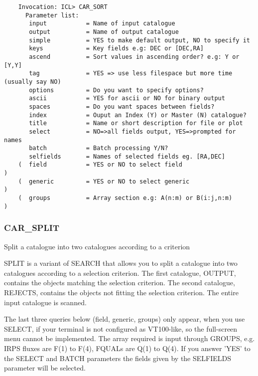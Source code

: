 \begin{verbatim}
    Invocation: ICL> CAR_SORT
      Parameter list:
       input           = Name of input catalogue
       output          = Name of output catalogue
       simple          = YES to make default output, NO to specify it
       keys            = Key fields e.g: DEC or [DEC,RA]
       ascend          = Sort values in ascending order? e.g: Y or [Y,Y]
       tag             = YES => use less filespace but more time (usually say NO)
       options         = Do you want to specify options?
       ascii           = YES for ascii or NO for binary output
       spaces          = Do you want spaces between fields?
       index           = Ouput an Index (Y) or Master (N) catalogue?
       title           = Name or short description for file or plot
       select          = NO=>all fields output, YES=>prompted for names
       batch           = Batch processing Y/N?
       selfields       = Names of selected fields eg. [RA,DEC]
    (  field           = YES or NO to select field                               )
    (  generic         = YES or NO to select generic                             )
    (  groups          = Array section e.g: A(n:m) or B(i:j,n:m)                 )
\end{verbatim}

\subsubsection{CAR\_SPLIT}

Split a catalogue into two catalogues according to a criterion

SPLIT is a variant of SEARCH that allows you to split a catalogue into
two catalogues according to a selection criterion.
The first catalogue, OUTPUT, contains the objects matching the selection
criterion.
The second catalogue, REJECTS, contains the objects not fitting the selection
criterion.
The entire input catalogue is scanned.

The last three queries below (field, generic, groups) only appear, when you use
SELECT, if your terminal is not configured as VT100-like, so the full-screen
menu cannot be implemented.
The array required is input through GROUPS, e.g. IRPS fluxes are F(1) to
F(4), FQUALs are Q(1) to Q(4).
If you answer 'YES' to the SELECT and BATCH parameters the fields given by the
SELFIELDS parameter will be selected.

